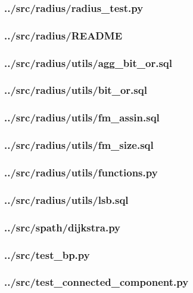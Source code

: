 \subsubsection{../src/radius/radius\_test.py}

\subsubsection{../src/radius/README}

\subsubsection{../src/radius/utils/agg\_bit\_or.sql}

\subsubsection{../src/radius/utils/bit\_or.sql}

\subsubsection{../src/radius/utils/fm\_assin.sql}

\subsubsection{../src/radius/utils/fm\_size.sql}

\subsubsection{../src/radius/utils/functions.py}

\subsubsection{../src/radius/utils/lsb.sql}

\subsubsection{../src/spath/dijkstra.py}

\subsubsection{../src/test\_bp.py}

\subsubsection{../src/test\_connected\_component.py}

